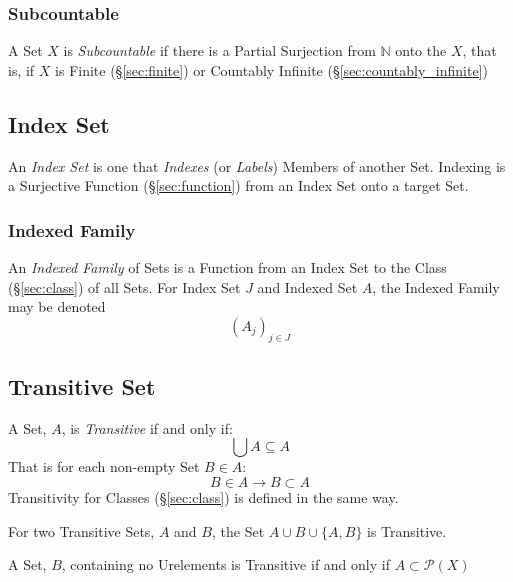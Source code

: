 \subsubsection{Subcountable}\label{sec:subcountable}

A Set $X$ is \emph{Subcountable} if there is a Partial Surjection from
$\mathbb{N}$ onto the $X$, that is, if $X$ is Finite
(\S\ref{sec:finite}) or Countably Infinite
(\S\ref{sec:countably_infinite})



\subsection{Index Set}\label{sec:index_set}

An \emph{Index Set} is one that \emph{Indexes} (or \emph{Labels})
Members of another Set. Indexing is a Surjective Function
(\S\ref{sec:function}) from an Index Set onto a target Set.



\subsubsection{Indexed Family}\label{sec:indexed_family}

An \emph{Indexed Family} of Sets is a Function from an Index Set to
the Class (\S\ref{sec:class}) of all Sets. For Index Set $J$ and
Indexed Set $A$, the Indexed Family may be denoted
\[
  (A_j)_{j \in J}
\]



\subsection{Transitive Set}\label{sec:transitive_set}

A Set, $A$, is \emph{Transitive} if and only if:
\[
  \bigcup A \subseteq A
\]
That is for each non-empty Set $B \in A$:
\[
  B \in A \rightarrow B \subset A
\]
Transitivity for Classes (\S\ref{sec:class}) is defined in the same
way.

For two Transitive Sets, $A$ and $B$, the Set $A \cup B \cup \{A,B\}$
is Transitive.

A Set, $B$, containing no Urelements is Transitive if and only if $A
\subset \mathcal{P}(X)$



